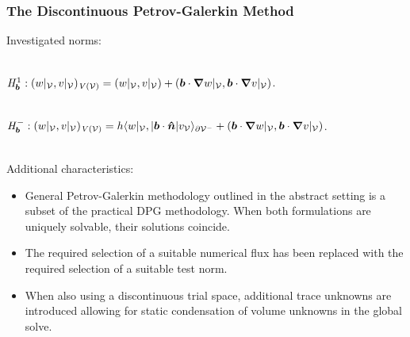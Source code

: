 \begin{frame}
\frametitle{The Discontinuous Petrov-Galerkin Method}

Investigated norms:
\\~

$\fspace{H}^1_\varv{b}: (w|_{\fe{V}},v|_{\fe{V}})_{\fspace{V}(\fe{V})}
  = (w|_{\fe{V}},v|_{\fe{V}}) +(\varv{b} \cdot \nabla w|_{\fe{V}},\varv{b} \cdot \nabla v|_{\fe{V}})$.
\\~

$\fspace{H}^-_\varv{b}: (w|_{\fe{V}},v|_{\fe{V}})_{\fspace{V}(\fe{V})} =
  h \langle w|_{\fe{V}},|\varv{b} \cdot \varv{\hat{n}}| v_{\fe{V}} \rangle_{\partial \fe{V}^-} +(\varv{b} \cdot \nabla w|_{\fe{V}},\varv{b} \cdot \nabla v|_{\fe{V}})$.
\\~

Additional characteristics:
\begin{itemize}
  \item General Petrov-Galerkin methodology outlined in the abstract setting is
    a subset of the practical DPG methodology. When both formulations are
    uniquely solvable, their solutions coincide.
  \item The required selection of a suitable numerical flux has been replaced
    with the required selection of a suitable test norm.
  \item When also using a discontinuous trial space, additional trace unknowns
    are introduced allowing for static condensation of volume unknowns in the
    global solve.
\end{itemize}

\end{frame}

